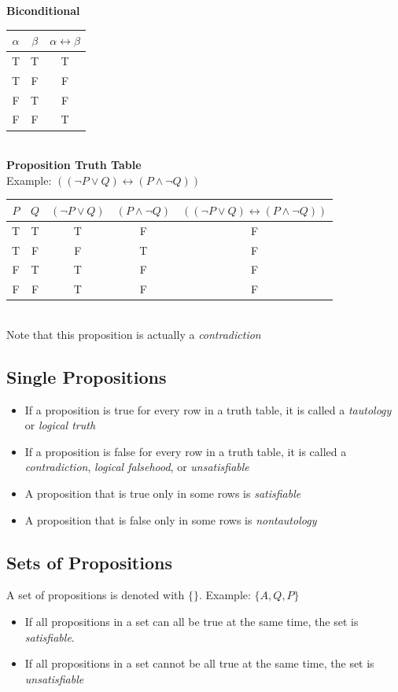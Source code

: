 \documentclass[]{article}
\begin{document}
\textbf{Biconditional}\\
\begin{tabular}{|c|c|c|}
	\hline
	$\alpha$ & $\beta$ & $\alpha \leftrightarrow \beta$\\
	\hline
	T & T & T\\
	T & F & F\\
	F & T & F\\
	F & F & T\\
	\hline
\end{tabular}\vspace{10pt}\\
\textbf{Proposition Truth Table}\\
Example: $((\neg{P} \vee Q) \leftrightarrow (P \wedge \neg{Q}))$\vspace{5pt}\\
\begin{tabular}{|c|c|c|c|c|}
	\hline
	$P$ & $Q$ & $(\neg{P} \vee Q)$ & $(P \wedge \neg{Q})$ & $((\neg{P} \vee Q) \leftrightarrow (P \wedge \neg{Q}))$ \\
	\hline
	T & T & T & F & F\\
	T & F & F & T & F\\
	F & T & T & F & F\\
	F & F & T & F & F\\
	\hline
\end{tabular}\vspace{10pt}\\
Note that this proposition is actually a \textit{contradiction}
\subsection{Single Propositions}
\begin{itemize}
	\item{If a proposition is true for every row in a truth table, it is called a \textit{tautology} or \textit{logical truth}}
	\item{If a proposition is false for every row in a truth table, it is called a \textit{contradiction}, \textit{logical falsehood}, or \textit{unsatisfiable}}
	\item{A proposition that is true only in some rows is \textit{satisfiable}}
	\item{A proposition that is false only in some rows is \textit{nontautology}}
\end{itemize}
\subsection{Sets of Propositions}
A set of propositions is denoted with $\{\}$. Example: $\{A, Q, P\}$
\begin{itemize}
	\item{If all propositions in a set can all be true at the same time, the set is \textit{satisfiable}}.
	\item{If all propositions in a set cannot be all true at the same time, the set is \textit{unsatisfiable}}
\end{itemize}
\end{document}
